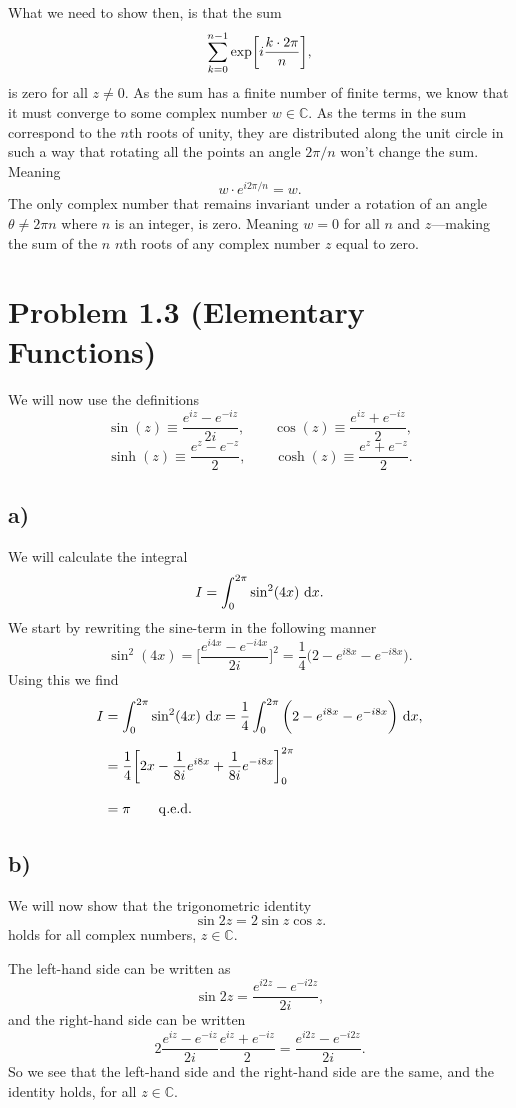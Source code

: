 \documentclass[a4paper, 11pt, titlepage, english]{article}
\begin{document}
What we need to show then, is that the sum 
$$\sum_{k=0}^{n-1}  {\rm exp}\bigg[i\frac{k\cdot2\pi}{n}\bigg],$$
is zero for all $z \neq 0$. As the sum has a finite number of finite terms, we know that it must converge to some complex number $w \in \mathbb{C}$. As the terms in the sum correspond to the $n$th roots of unity, they are distributed along the unit circle in such a way that rotating all the points an angle $2\pi/n$ won't change the sum. Meaning
$$w\cdot e^{i2\pi/n} = w.$$
The only complex number that remains invariant under a rotation of an angle $\theta \neq 2\pi n$ where $n$ is an integer, is zero. Meaning $w = 0$ for all $n$ and $z$---making the sum of the $n$ $n$th roots of any complex number $z$ equal to zero.

\section*{Problem 1.3 (Elementary Functions)}
We will now use the definitions
$$\sin(z) \equiv \frac{e^{iz}-e^{-iz}}{2i}, \qquad \cos(z)\equiv\frac{e^{iz} + e^{-iz}}{2}, $$
$$ \sinh(z)\equiv\frac{e^z-e^{-z}}{2}, \qquad \cosh(z)\equiv\frac{e^z + e^{-z}}{2}.$$

\subsection*{a)}
We will calculate the integral
$$I = \int_0^{2\pi} \sin^2(4x) {\rm\ d}x.$$ 
We start by rewriting the sine-term in the following manner
$$\sin^2(4x) = \bigg[\frac{e^{i4x}-e^{-i4x}}{2i}\bigg]^2 = \frac{1}{4}\bigg(2 - e^{i8x} - e^{-i8x}\bigg).$$
Using this we find
\begin{align*}
I &=  \int_0^{2\pi} \sin^2(4x) {\rm\ d}x = \frac{1}{4}\int_0^{2\pi} \bigg(2 - e^{i8x} - e^{-i8x}\bigg) {\rm\ d}x, \\[0.2cm]
&= \frac{1}{4}\bigg[2x - \frac{1}{8i}e^{i8x} + \frac{1}{8i}e^{-i8x}\bigg]_{0}^{2\pi} \\[0.3cm]
&= \pi \qquad {\rm q.e.d.}
\end{align*}

\subsection*{b)}
We will now show that the trigonometric identity 
$$\sin 2z = 2\sin z \cos z.$$
holds for all complex numbers, $z\in\mathbb{C}$.

The left-hand side can be written as
$$\sin 2z = \frac{e^{i2z}-e^{-i2z}}{2i},$$
and the right-hand side can be written
$$2\frac{e^{iz} - e^{-iz}}{2i}\frac{e^{iz} + e^{-iz}}{2} = \frac{e^{i2z}-e^{-i2z}}{2i}.$$
So we see that the left-hand side and the right-hand side are the same, and the identity holds, for all $z\in\mathbb{C}$.
\end{document}

